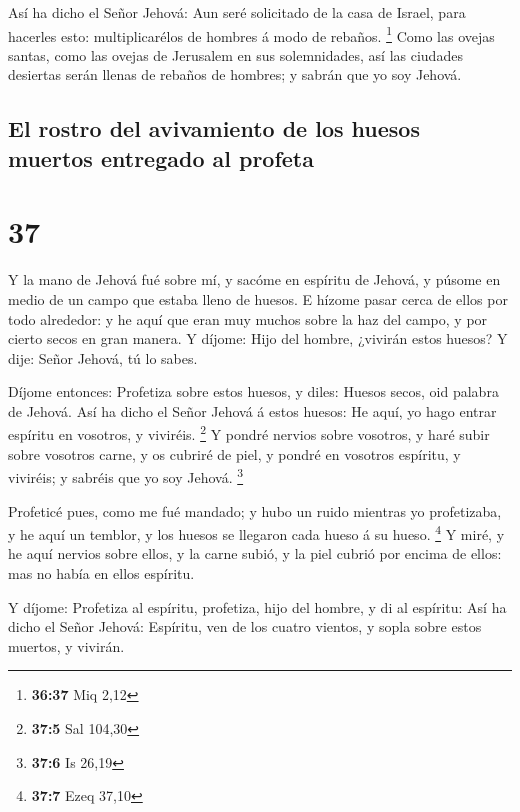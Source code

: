  Así ha dicho el Señor Jehová: Aun seré solicitado de la
casa de Israel, para hacerles esto: multiplicarélos de hombres á modo de
rebaños. \footnote{\textbf{36:37} Miq 2,12}  Como las
ovejas santas, como las ovejas de Jerusalem en sus solemnidades, así las
ciudades desiertas serán llenas de rebaños de hombres; y sabrán que yo
soy Jehová.

\hypertarget{el-rostro-del-avivamiento-de-los-huesos-muertos-entregado-al-profeta}{%
\subsection{El rostro del avivamiento de los huesos muertos entregado al
profeta}\label{el-rostro-del-avivamiento-de-los-huesos-muertos-entregado-al-profeta}}

\hypertarget{section-36}{%
\section{37}\label{section-36}}

 Y la mano de Jehová fué sobre mí, y sacóme en espíritu de
Jehová, y púsome en medio de un campo que estaba lleno de huesos.
 E hízome pasar cerca de ellos por todo alrededor: y he aquí
que eran muy muchos sobre la haz del campo, y por cierto secos en gran
manera.  Y díjome: Hijo del hombre, ¿vivirán estos huesos? Y
dije: Señor Jehová, tú lo sabes.

 Díjome entonces: Profetiza sobre estos huesos, y diles:
Huesos secos, oid palabra de Jehová.  Así ha dicho el Señor
Jehová á estos huesos: He aquí, yo hago entrar espíritu en vosotros, y
viviréis. \footnote{\textbf{37:5} Sal 104,30}  Y pondré
nervios sobre vosotros, y haré subir sobre vosotros carne, y os cubriré
de piel, y pondré en vosotros espíritu, y viviréis; y sabréis que yo soy
Jehová. \footnote{\textbf{37:6} Is 26,19}

 Profeticé pues, como me fué mandado; y hubo un ruido
mientras yo profetizaba, y he aquí un temblor, y los huesos se llegaron
cada hueso á su hueso. \footnote{\textbf{37:7} Ezeq 37,10} 
Y miré, y he aquí nervios sobre ellos, y la carne subió, y la piel
cubrió por encima de ellos: mas no había en ellos espíritu.

 Y díjome: Profetiza al espíritu, profetiza, hijo del
hombre, y di al espíritu: Así ha dicho el Señor Jehová: Espíritu, ven de
los cuatro vientos, y sopla sobre estos muertos, y vivirán.

